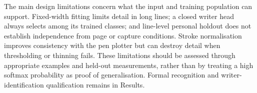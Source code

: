 The main design limitations concern what the input and training population can support. Fixed-width fitting limits detail in long lines; a closed writer head always selects among its trained classes; and line-level personal holdout does not establish independence from page or capture conditions. Stroke normalisation improves consistency with the pen plotter but can destroy detail when thresholding or thinning fails. These limitations should be assessed through appropriate examples and held-out measurements, rather than by treating a high softmax probability as proof of generalisation. Formal recognition and writer-identification qualification remains in Results.
\FloatBarrier
